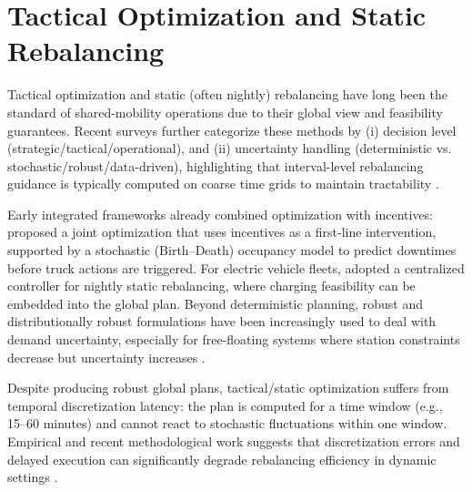 \section{Tactical Optimization and Static Rebalancing}

Tactical optimization and static (often nightly) rebalancing have long been the standard of shared-mobility operations due to their global view and feasibility guarantees. Recent surveys further categorize these methods by (i) decision level (strategic/tactical/operational), and (ii) uncertainty handling (deterministic vs. stochastic/robust/data-driven), highlighting that interval-level rebalancing guidance is typically computed on coarse time grids to maintain tractability \parencite{gao2025uncertainties}.

Early integrated frameworks already combined optimization with incentives: \textcite{chiariotti2020} proposed a joint optimization that uses incentives as a first-line intervention, supported by a stochastic (Birth--Death) occupancy model to predict downtimes before truck actions are triggered. For electric vehicle fleets, \textcite{bogyrbayeva2022} adopted a centralized controller for nightly static rebalancing, where charging feasibility can be embedded into the global plan. Beyond deterministic planning, robust and distributionally robust formulations have been increasingly used to deal with demand uncertainty, especially for free-floating systems where station constraints decrease but uncertainty increases \parencite{chen2024optimizing}. 

Despite producing robust global plans, tactical/static optimization suffers from temporal discretization latency: the plan is computed for a time window (e.g., 15--60 minutes) and cannot react to stochastic fluctuations within one window. Empirical and recent methodological work suggests that discretization errors and delayed execution can significantly degrade rebalancing efficiency in dynamic settings \parencite{liang2025}. 

